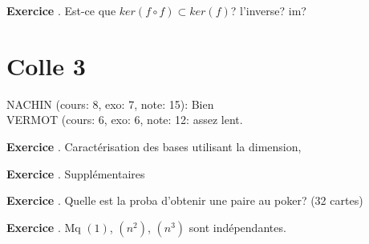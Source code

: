 \documentclass[10pt,a4paper]{article}
\newcounter{question}
\newcounter{exo}
\newenvironment{exo}{\vspace{0.5cm}\setcounter{question}{0}\addtocounter{exo}{1} \noindent \textbf{Exercice \theexo}. \normalsize }{\par}
\begin{document}
	\begin{exo}
		Est-ce que $ker(f \circ f) \subset ker(f)$? l'inverse? im?
	\end{exo}	

	\section*{Colle 3}
	\setcounter{exo}{0}
	NACHIN (cours: 8, exo: 7, note: 15): Bien\\
	VERMOT (cours: 6, exo: 6, note: 12: assez lent.\\
	
	\begin{exo}
		  Caractérisation des bases utilisant la dimension,
	\end{exo}		
	
	\begin{exo}
		Supplémentaires
	\end{exo}

	\begin{exo}
		Quelle est la proba d'obtenir une paire au poker? (32 cartes)
	\end{exo}
	
	\begin{exo}
		Mq $(1)$, $(n^2)$, $(n^3)$ sont indépendantes.
	\end{exo}
\end{document}
